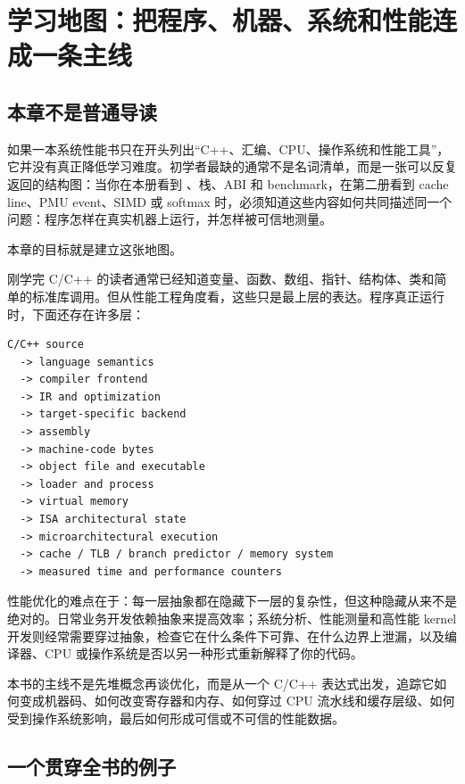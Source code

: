 \chapter{学习地图：把程序、机器、系统和性能连成一条主线}

\section{本章不是普通导读}

如果一本系统性能书只在开头列出“C++、汇编、CPU、操作系统和性能工具”，它并没有真正降低学习难度。初学者最缺的通常不是名词清单，而是一张可以反复返回的结构图：当你在本册看到 、栈、ABI 和 benchmark，在第二册看到 cache line、PMU event、SIMD 或 softmax 时，必须知道这些内容如何共同描述同一个问题：程序怎样在真实机器上运行，并怎样被可信地测量。

本章的目标就是建立这张地图。

刚学完 C/C++ 的读者通常已经知道变量、函数、数组、指针、结构体、类和简单的标准库调用。但从性能工程角度看，这些只是最上层的表达。程序真正运行时，下面还存在许多层：

\begin{center}
\begin{minipage}{0.9\linewidth}
\begin{verbatim}
C/C++ source
  -> language semantics
  -> compiler frontend
  -> IR and optimization
  -> target-specific backend
  -> assembly
  -> machine-code bytes
  -> object file and executable
  -> loader and process
  -> virtual memory
  -> ISA architectural state
  -> microarchitectural execution
  -> cache / TLB / branch predictor / memory system
  -> measured time and performance counters
\end{verbatim}
\end{minipage}
\end{center}

性能优化的难点在于：每一层抽象都在隐藏下一层的复杂性，但这种隐藏从来不是绝对的。日常业务开发依赖抽象来提高效率；系统分析、性能测量和高性能 kernel 开发则经常需要穿过抽象，检查它在什么条件下可靠、在什么边界上泄漏，以及编译器、CPU 或操作系统是否以另一种形式重新解释了你的代码。

\begin{keyidea}
本书的主线不是先堆概念再谈优化，而是从一个 C/C++ 表达式出发，追踪它如何变成机器码、如何改变寄存器和内存、如何穿过 CPU 流水线和缓存层级、如何受到操作系统影响，最后如何形成可信或不可信的性能数据。
\end{keyidea}

\section{一个贯穿全书的例子}


